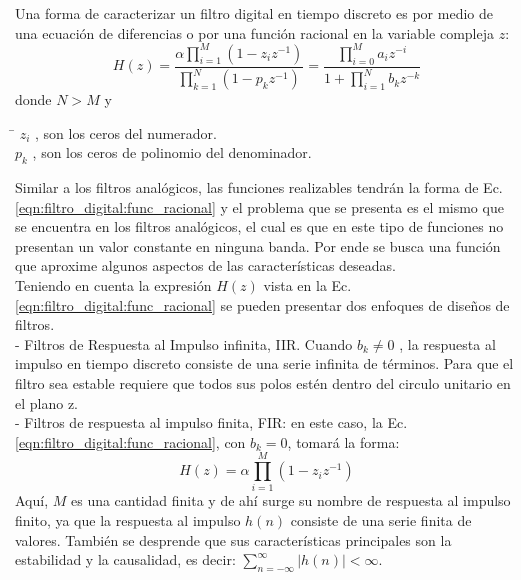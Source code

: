 \documentclass[informe.tex]{subfiles}
\begin{document}
Una forma de caracterizar un filtro digital en tiempo discreto es por medio de una ecuación de diferencias o por una función racional en la variable compleja $z$:
	\begin{equation}
		\label{eqn:filtro_digital:func_racional}	
		H(z) = \frac{
						\alpha \prod_{i=1}^{M}{(1-z_i z^{-1})}
					}{
						\prod_{k=1}^{N}{(1-p_k z^{-1})}
					}					
			= \frac{
						\prod_{i=0}^{M}{a_i z^{-i}}
					}{
						1 + \prod_{i=1}^{N}{b_k z^{-k}}
					}
	\end{equation}
donde  $N>M$ y
	\begin{tabbing}
		\= \kill
        \tab[0.25cm]$z_i$\> , son los ceros del numerador.\\
		\tab[0.25cm]$p_{k}$\> , son los ceros de polinomio del denominador. 
	\end{tabbing}	
	
Similar a los filtros analógicos, las funciones realizables tendrán la forma de Ec. \ref{eqn:filtro_digital:func_racional} y el problema que se presenta es el mismo que se encuentra en los filtros analógicos, el cual es que en este tipo de funciones no presentan un valor constante en ninguna banda.  Por ende se busca una función que aproxime algunos aspectos de las características deseadas.\\

Teniendo en cuenta la expresión $H(z)$ vista en la Ec. \ref{eqn:filtro_digital:func_racional} se pueden presentar dos enfoques de diseños de filtros.\\

- Filtros de Respuesta al Impulso infinita, IIR. Cuando $b_k \neq 0$ , la respuesta al impulso en tiempo discreto consiste de una serie infinita de términos. Para que el filtro sea estable requiere que todos sus polos estén dentro del circulo unitario en el plano z.\\

- Filtros de respuesta al impulso finita, FIR: en este caso, la Ec. \ref{eqn:filtro_digital:func_racional}, con $b_k=0$, tomará la forma:
	$$
		H(z)=\alpha \prod_{i=1}^{M} (1-z_i z^{-1})
	$$
Aquí, $M$ es una cantidad finita y de ahí surge su nombre de respuesta al impulso finito, ya que la respuesta al impulso $h(n)$ consiste de una serie finita de valores. También se desprende que sus características principales son la estabilidad y la causalidad, es decir: $	\sum_{n=-\infty}^{\infty}{ |h(n)|}<\infty$. 
\end{document}
